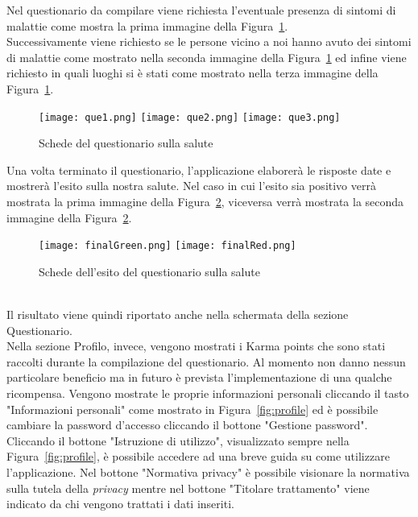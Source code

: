 \begin{trivlist}
	Nel questionario da compilare viene richiesta l'eventuale presenza di sintomi di malattie come mostra la prima immagine della Figura~\ref{fig:queSlide}. \\
	Successivamente viene richiesto se le persone vicino a noi hanno avuto dei sintomi di malattie come mostrato nella seconda immagine della Figura~\ref{fig:queSlide} ed infine viene richiesto in quali luoghi si è stati come mostrato nella terza immagine della Figura~\ref{fig:queSlide}.
	\begin{figure}[h]
		\begin{center}
			\texttt{[image: que1.png]}\hfill
			\texttt{[image: que2.png]}\hfill
			\texttt{[image: que3.png]}
			\caption{Schede del questionario sulla salute}\label{fig:queSlide}
		\end{center}
	\end{figure}
	Una volta terminato il questionario, l'applicazione elaborerà le risposte date e mostrerà l'esito sulla nostra salute. Nel caso in cui l'esito sia positivo verrà mostrata la prima immagine della Figura~\ref{fig:quefinal}, viceversa verrà mostrata la seconda immagine della Figura~\ref{fig:quefinal}.
	\begin{figure}[h]
		\begin{center}
			\texttt{[image: finalGreen.png]}\hfil
			\texttt{[image: finalRed.png]}
			\caption{Schede dell'esito del questionario sulla salute}\label{fig:quefinal}
		\end{center}
	\end{figure}\\
	Il risultato viene quindi riportato anche nella schermata della sezione Questionario.
	\\
	Nella sezione Profilo, invece, vengono mostrati i Karma points che sono stati raccolti durante la compilazione del questionario. Al momento non danno nessun particolare beneficio ma in futuro è prevista l'implementazione di una qualche ricompensa. Vengono mostrate le proprie informazioni personali cliccando il tasto "Informazioni personali" come mostrato in Figura~\ref{fig:profile} ed è possibile cambiare la password d'accesso cliccando il bottone "Gestione password". Cliccando il bottone "Istruzione di utilizzo", visualizzato sempre nella Figura~\ref{fig:profile}, è possibile accedere ad una breve guida su come utilizzare l'applicazione. Nel bottone "Normativa privacy" è possibile visionare la normativa sulla tutela della \emph{privacy}  mentre nel bottone "Titolare trattamento" viene indicato da chi vengono trattati i dati inseriti.

\end{trivlist}
